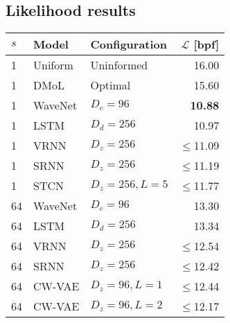 {\subsection{Likelihood results}
%
\begin{table}[t]
    \begin{subtable}[t]{.45\textwidth}
    \centering
    \begin{adjustbox}{center, totalheight=0.35\paperheight}
    \begin{tabular}[t]{lll|r}
        \toprule
        $s$ & \bfseries Model         & \bfseries Configuration           & \bfseries $\mathcal{L}$ [bpf] \\
        \midrule
        1 & Uniform             & Uninformed                  & 16.00 \\
        1 & DMoL                & Optimal                     & 15.60 \\   %
        \midrule
        1 & WaveNet             & $D_c=96$                    & \textbf{10.88} \\  %
        1 & LSTM                & $D_d=256$                   & 10.97 \\  %
        1 & VRNN                & $D_z=256$                   & $\leq$11.09 \\  %
        1 & SRNN                & $D_z=256$                   & $\leq$11.19 \\  %
        1 & STCN                & $D_z=256,L=5$               & $\leq$11.77 \\  %
        \midrule
        64 & WaveNet            & $D_c=96$                    & 13.30 \\  %
        64 & LSTM               & $D_d=256$                   & 13.34 \\  %
        64 & VRNN               & $D_z=256$                   & $\leq$12.54 \\  %
        64 & SRNN               & $D_z=256$                   & $\leq$12.42 \\  %
        64 & CW-VAE             & $D_z=96,L=1$                & $\leq$12.44 \\
        64 & CW-VAE             & $D_z=96,L=2$                & $\leq$12.17 \\

\end{tabular}
\end{adjustbox}
\end{subtable}
\end{table}}

